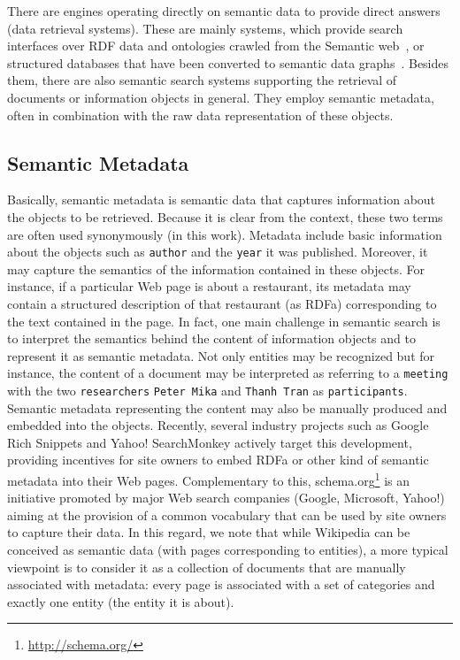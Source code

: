 There are engines operating directly on semantic data to provide direct answers (data retrieval systems). These are mainly systems, which provide search interfaces over RDF data and ontologies crawled from the Semantic web~\cite{DBLP:journals/ijswis/ChengQ09,DBLP:journals/ws/TranWH09,DBLP:journals/ws/HoganHUKPD11}, or structured databases that have been converted to semantic data graphs~\cite{DBLP:conf/sigmod/LiJLF09,DBLP:conf/sigmod/LiOFWZ08}. Besides them, there are also semantic search systems supporting the retrieval of documents or information objects in general. They employ semantic metadata, often in combination with the raw data representation of these objects. 
	
\subsection{Semantic Metadata}
Basically, semantic metadata is semantic data that captures information about the objects to be retrieved. Because it is clear from the context, these two terms are often used synonymously (in this work). Metadata include basic information about the objects such as \verb+author+ and the \verb+year+ it was published. Moreover, it may capture the semantics of the information contained in these objects. For instance, if a particular Web page is about a restaurant, its metadata may contain a structured description of that restaurant (as RDFa) corresponding to the text contained in the page. In fact, one main challenge in semantic search is to interpret the semantics behind the content of information objects and to represent it as semantic metadata. Not only entities may be recognized but for instance, the content of a document may be interpreted as referring to a \verb+meeting+ with the two \verb+researchers+ \verb+Peter Mika+ and \verb+Thanh Tran+ as \verb+participants+. Semantic metadata representing the content may also be manually produced and embedded into the objects. Recently, several industry projects such as Google Rich Snippets and Yahoo! SearchMonkey actively target this development, providing incentives for site owners to embed RDFa or other kind of semantic metadata into their Web pages. Complementary to this,  schema.org\footnote{\url{http://schema.org/}} is an initiative promoted by major Web search companies (Google, Microsoft, Yahoo!) aiming at the provision of a common vocabulary that can be used by site owners to capture their data. In this regard, we note that while Wikipedia can be conceived as semantic data (with pages corresponding to entities), a more typical viewpoint is to consider it as a collection of documents that are manually associated with metadata: every page is associated with a set of categories and exactly one entity (the entity it is about).  




